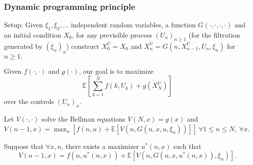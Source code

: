 \documentclass{article}
\theoremstyle{definition}
\begin{document}

\subsubsection{Dynamic programming principle}
Setup: Given $\xi_1,\xi_2,\ldots$ independent random variables, a function $G(\cdot ,\cdot ,\cdot, \cdot)$ and an initial condition $X_0$, for any previsible process $(U_n)_{n\ge 1}$ (for the filtration generated by $(\xi_n)_n$) construct $X_0^U = X_0$ and $X_n^U = G(n,X_{n-1}^U, U_n, \xi_n)$ for $n\ge 1.$
\vspace{1mm}

Given $f(\cdot ,\cdot )$ and $g(\cdot)$, our goal is to maximize \[
\mathbb{E}[\sum_{k=1}^{N} f(k,U_k)+g(X_N^U)]
\]
over the controls $(U_n)_n$.

Let $V(\cdot ,\cdot )$ solve the Bellman equations $V(N,x)=g(x)$ and $V(n-1,x) = \max_{u} \left[f(n,u) + \mathbb{E}[V(n,G(n,x,u,\xi_n))] \right] ~\forall 1\le n\le N, ~\forall x$.

Suppose that $\forall x,n$, there exists a maximizer $u^*(n,x)$ such that $$V(n-1,x)=f(n,u^*(n,x)) + \mathbb{E}[V(n,G(n,x,u^*(n,x)), \xi_n)].$$
\end{document}
